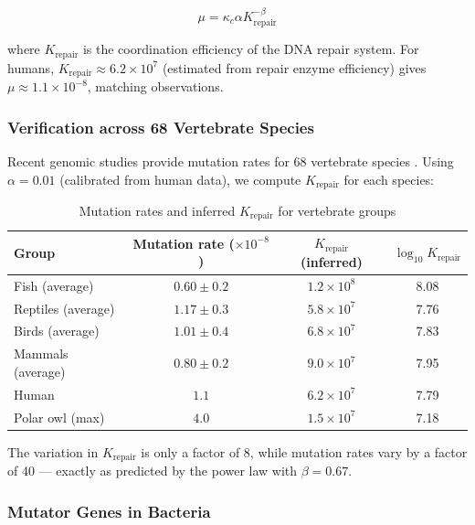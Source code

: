 \documentclass[12pt,a4paper]{article}
\theoremstyle{remark}
\newcommand{\kappac}{\kappa_c}
\begin{document}
	\begin{equation}
		\mu = \kappac \alpha K_{\text{repair}}^{-\beta}
		\label{eq:mutation-rate}
	\end{equation}
	
	where $K_{\text{repair}}$ is the coordination efficiency of the DNA repair system. For humans, $K_{\text{repair}} \approx 6.2 \times 10^7$ (estimated from repair enzyme efficiency) gives $\mu \approx 1.1 \times 10^{-8}$, matching observations.
	
	\subsubsection{Verification across 68 Vertebrate Species}
	
	Recent genomic studies provide mutation rates for 68 vertebrate species \cite{Bergeron2023}. Using $\alpha = 0.01$ (calibrated from human data), we compute $K_{\text{repair}}$ for each species:
	
	\begin{table}[htbp]
		\centering
		\caption{Mutation rates and inferred $K_{\text{repair}}$ for vertebrate groups \cite{Bergeron2023}}
		\label{tab:vertebrate-mutations}
		\small
		\begin{tabular}{lccc}
			\toprule
			\textbf{Group} & \textbf{Mutation rate ($\times 10^{-8}$)} & \textbf{$K_{\text{repair}}$ (inferred)} & $\log_{10} K_{\text{repair}}$ \\
			\midrule
			Fish (average) & $0.60 \pm 0.2$ & $1.2 \times 10^8$ & 8.08 \\
			Reptiles (average) & $1.17 \pm 0.3$ & $5.8 \times 10^7$ & 7.76 \\
			Birds (average) & $1.01 \pm 0.4$ & $6.8 \times 10^7$ & 7.83 \\
			Mammals (average) & $0.80 \pm 0.2$ & $9.0 \times 10^7$ & 7.95 \\
			Human & $1.1$ & $6.2 \times 10^7$ & 7.79 \\
			Polar owl (max) & $4.0$ & $1.5 \times 10^7$ & 7.18 \\
			\bottomrule
		\end{tabular}
	\end{table}
	
	The variation in $K_{\text{repair}}$ is only a factor of 8, while mutation rates vary by a factor of 40 — exactly as predicted by the power law with $\beta = 0.67$.
	
	\subsubsection{Mutator Genes in Bacteria}
	
\end{document}
